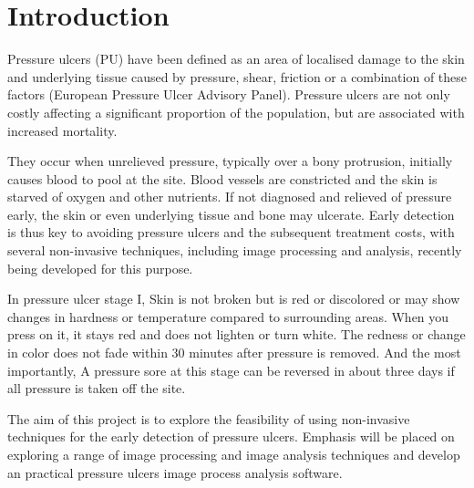 \chapter{Introduction}
Pressure ulcers (PU) have been defined as an area of localised damage to the skin
and underlying tissue caused by pressure, shear, friction or a combination of these
factors (European Pressure Ulcer Advisory Panel). Pressure ulcers are not only costly affecting a significant proportion of the population, but are associated with increased mortality.

They occur when unrelieved pressure, typically over a bony protrusion, initially causes blood to pool at the site. Blood vessels are constricted and the skin is starved of oxygen and other nutrients. If not diagnosed and relieved of pressure early, the skin or even underlying tissue and bone may ulcerate. Early detection is thus key to avoiding pressure ulcers and the subsequent treatment costs, with several non-invasive techniques, including image processing and analysis, recently being developed for this purpose.

In pressure ulcer stage I, Skin is not broken but is red or discolored or may show changes in hardness or temperature compared to surrounding areas. When you press on it, it stays red and does not lighten or turn white. The redness or change in color does not fade within 30 minutes after pressure is removed. And the most importantly, A pressure sore at this stage can be reversed in about three days if all pressure is taken off the site. 

The aim of this project is to explore the feasibility of using non-invasive techniques for the early detection of pressure ulcers. Emphasis will be placed on exploring a range of image processing and image analysis techniques and develop an practical pressure ulcers image process analysis software.



